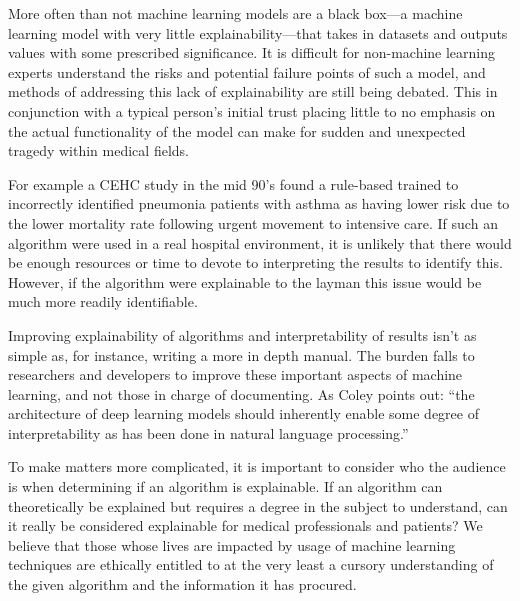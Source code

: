\documentclass[]{article}
\begin{document}
		More often than not machine learning models are a black box---a machine learning model with very little explainability---that takes in datasets and outputs values with some prescribed significance. It is difficult for non-machine learning experts understand the risks and potential failure points of such a model, and methods of addressing this lack of explainability are still being debated.\cite{10.1145/2858036.2858529,10.1145/3328519.3329126} This in conjunction with a typical person's initial trust placing little to no emphasis on the actual functionality of the model\cite{siau2018building} can make for sudden and unexpected tragedy within medical fields.
		
		For example a CEHC study in the mid 90's found a rule-based trained to incorrectly identified pneumonia patients with asthma as having lower risk due to the lower mortality rate following urgent movement to intensive care.\cite{caruana2015intelligible} If such an algorithm were used in a real hospital environment, it is unlikely that there would be enough resources or time to devote to interpreting the results to identify this. However, if the algorithm were explainable to the layman this issue would be much more readily identifiable. 

		Improving explainability of algorithms and interpretability of results isn't as simple as, for instance, writing a more in depth manual. The burden falls to researchers and developers to improve these important aspects of machine learning, and not those in charge of documenting. As Coley points out: ``the architecture of deep learning models should inherently enable some degree of interpretability as has been done in natural language processing.''\cite{ColeyRSC}
		
		To make matters more complicated, it is important to consider who the audience is when determining if an algorithm is explainable. If an algorithm can theoretically be explained but requires a degree in the subject to understand, can it really be considered explainable for medical professionals and patients? We believe that those whose lives are impacted by usage of machine learning techniques are ethically entitled to at the very least a cursory understanding of the given algorithm and the information it has procured.
\end{document}
